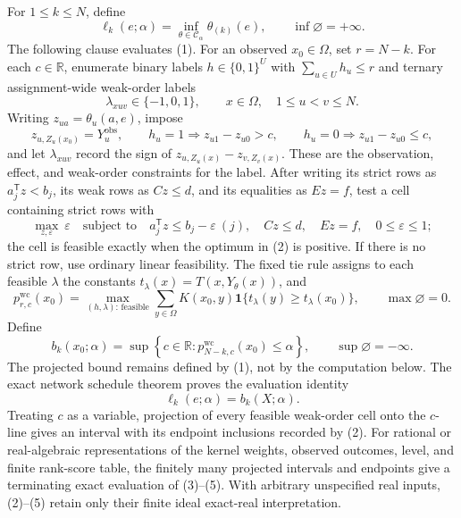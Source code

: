 For \(1\leq k\leq N\), define
\[
\ell_k(e;\alpha)
=\inf_{\theta\in\mathcal C_{\alpha}}\theta_{(k)}(e),
\qquad
\inf\varnothing=+\infty.
\tag{1}
\]
The following clause evaluates (1).  For an observed \(x_0\in\Omega\), set
\(r=N-k\).  For each \(c\in\mathbb R\), enumerate binary labels
\(h\in\{0,1\}^{U}\) with \(\sum_{u\in U}h_u\leq r\) and ternary
assignment-wide weak-order labels
\[
\lambda_{xuv}\in\{-1,0,1\},
\qquad x\in\Omega,\quad 1\leq u<v\leq N.
\]
Writing \(z_{ua}=\theta_u(a,e)\), impose
\[
z_{u,Z_u(x_0)}=Y_u^{\mathrm{obs}},
\qquad
h_u=1\Longrightarrow z_{u1}-z_{u0}>c,
\qquad
h_u=0\Longrightarrow z_{u1}-z_{u0}\leq c,
\]
and let \(\lambda_{xuv}\) record the sign of
\(z_{u,Z_u(x)}-z_{v,Z_v(x)}\).  These are the observation, effect, and
weak-order constraints for the label.
After writing its strict rows as \(a_j^{\mathsf T}z<b_j\), its weak rows as
\(Cz\leq d\), and its equalities as \(Ez=f\), test a cell containing strict
rows with
\[
\max_{z,\varepsilon}\ \varepsilon
\quad\text{subject to}\quad
a_j^{\mathsf T}z\leq b_j-\varepsilon\ (j),
\quad Cz\leq d,
\quad Ez=f,
\quad 0\leq\varepsilon\leq1;
\tag{2}
\]
the cell is feasible exactly when the optimum in (2) is positive.  If there is
no strict row, use ordinary linear feasibility.  The fixed tie rule assigns to
each feasible \(\lambda\) the constants
\(t_{\lambda}(x)=T(x,Y_{\theta}(x))\), and
\[
p^{\mathrm{wc}}_{r,c}(x_0)
=\max_{(h,\lambda):\,\mathrm{feasible}}
\sum_{y\in\Omega}K(x_0,y)
\mathbf 1\{t_{\lambda}(y)\geq t_{\lambda}(x_0)\},
\qquad \max\varnothing=0.
\tag{3}
\]
Define
\[
b_k(x_0;\alpha)
=\sup\left\{c\in\mathbb R:
p^{\mathrm{wc}}_{N-k,c}(x_0)\leq\alpha\right\},
\qquad \sup\varnothing=-\infty.
\tag{4}
\]
The projected bound remains defined by (1), not by the computation below.  The
exact network schedule theorem proves the evaluation identity
\[
\ell_k(e;\alpha)=b_k(X;\alpha).
\tag{5}
\]
Treating \(c\) as a variable, projection of every feasible weak-order cell onto
the \(c\)-line gives an interval with its endpoint inclusions recorded by (2).
For rational or real-algebraic representations of the kernel weights, observed
outcomes, level, and finite rank-score table, the finitely many projected
intervals and endpoints give a terminating exact evaluation of (3)--(5).  With
arbitrary unspecified real inputs, (2)--(5) retain only their finite ideal
exact-real interpretation.

